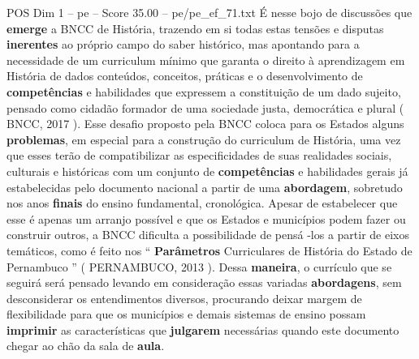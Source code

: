 \begin{textsample}{POS Dim 1 – pe – Score 35.00 – pe/pe\_ef\_71.txt}
É nesse bojo de discussões que \textbf{emerge} a BNCC de História, trazendo em si todas estas tensões e disputas \textbf{inerentes} ao próprio campo do saber histórico, mas apontando para a necessidade de um curriculum mínimo que garanta o direito à aprendizagem em História de dados conteúdos, conceitos, práticas e o desenvolvimento de \textbf{competências} e habilidades que expressem a constituição de um dado sujeito, pensado como cidadão formador de uma sociedade justa, democrática e plural ( BNCC, 2017 ).
Esse desafio proposto pela BNCC coloca para os Estados alguns \textbf{problemas}, em especial para a construção do curriculum de História, uma vez que esses terão de compatibilizar as especificidades de suas realidades sociais, culturais e históricas com um conjunto de \textbf{competências} e habilidades gerais já estabelecidas pelo documento nacional a partir de uma \textbf{abordagem}, sobretudo nos anos \textbf{finais} do ensino fundamental, cronológica.
Apesar de estabelecer que esse é apenas um arranjo possível e que os Estados e municípios podem fazer ou construir outros, a BNCC dificulta a possibilidade de pensá -los a partir de eixos temáticos, como é feito nos “ \textbf{Parâmetros} Curriculares de História do Estado de Pernambuco ” ( PERNAMBUCO, 2013 ).
Dessa \textbf{maneira}, o currículo que se seguirá será pensado levando em consideração essas variadas \textbf{abordagens}, sem desconsiderar os entendimentos diversos, procurando deixar margem de flexibilidade para que os municípios e demais sistemas de ensino possam \textbf{imprimir} as características que \textbf{julgarem} necessárias quando este documento chegar ao chão da sala de \textbf{aula}.

\end{textsample}
